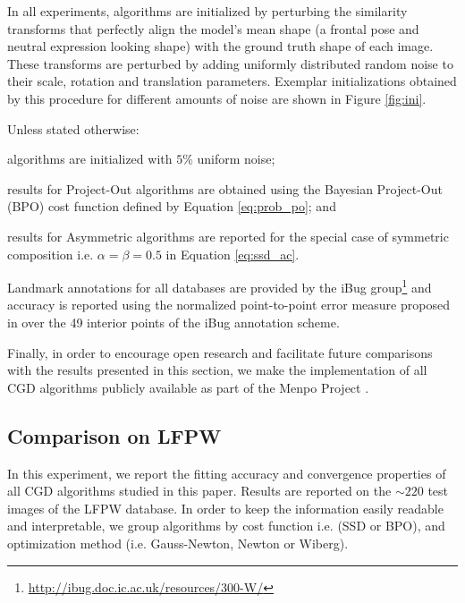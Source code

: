 In all experiments, algorithms are initialized by perturbing the similarity transforms that perfectly align the model's mean shape (a frontal pose and neutral expression looking shape) with the ground truth shape of each image. These transforms are perturbed by adding uniformly distributed random noise to their scale, rotation and translation parameters. Exemplar initializations obtained by this procedure for different amounts of noise are shown in Figure \ref{fig:ini}.

Unless stated otherwise:
\begin{inparaenum} 
\item algorithms are initialized with $5\%$ uniform noise;
\item results for Project-Out algorithms are obtained using the Bayesian Project-Out (BPO) cost function defined by Equation \ref{eq:prob_po}; and
\item results for Asymmetric algorithms are reported for the special case of symmetric composition i.e. $\alpha=\beta=0.5$ in Equation \ref{eq:ssd_ac}.
\end{inparaenum}

Landmark annotations for all databases are provided by the iBug group\footnote{\url{http://ibug.doc.ic.ac.uk/resources/300-W/}} and accuracy is reported using the normalized point-to-point error measure proposed in \cite{Zhu2012} over the 49 interior points of the iBug annotation scheme.

Finally, in order to encourage open research and facilitate future comparisons with the results presented in this section, we make the implementation of all CGD algorithms publicly available as part of the Menpo Project \cite{Menpo2014}.


\subsection{Comparison on LFPW}

In this experiment, we report the fitting accuracy and convergence properties of all CGD algorithms studied in this paper. Results are reported on the $\sim220$ test images of the LFPW database. In order to keep the information easily readable and interpretable, we group algorithms by cost function i.e. (SSD or BPO), and optimization method (i.e. Gauss-Newton, Newton or Wiberg).

